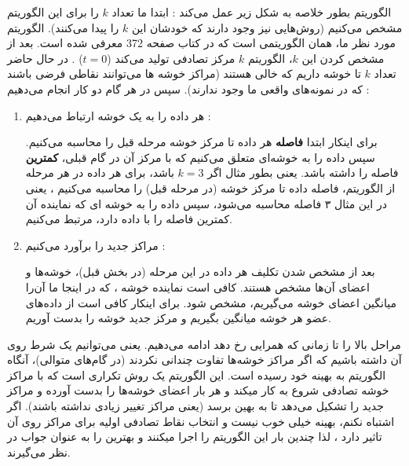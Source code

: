 \documentclass[a4paper, 12pt]{article}
\begin{document}
	الگوریتم 
	بطور خلاصه به شکل زیر عمل می‌کند : ابتدا ما تعداد $k$
	را برای این الگوریتم مشخص می‌کنیم (روش‌هایی نیز وجود دارند که خودشان این $k$ را پیدا می‌کنند). الگوریتم 
	مورد نظر ما، همان الگوریتمی است که در کتاب 
	\cite{book}
	صفحه 
	372
	معرفی شده است. بعد از مشخص کردن این $k$، الگوریتم $k$ مرکز تصادفی تولید می‌کند 
	($t = 0$)
	. در حال حاضر تعداد 
	$k$
	تا
	خوشه داریم که خالی هستند (مراکز خوشه ها می‌توانند نقاطی فرضی باشند که در نمونه‌های واقعی ما وجود ندارند). سپس در هر گام دو کار انجام می‌دهیم  : 
	\begin{enumerate}
		\item 
		هر داده‌ را به یک خوشه ارتباط می‌دهیم :  
		
		برای اینکار ابتدا
		\textbf{فاصله} 
		هر داده تا مرکز خوشه مرحله قبل را محاسبه می‌کنیم. 
		سپس داده را به خوشه‌ای متعلق می‌کنیم که با مرکز آن در گام قبلی، 
		\textbf{کمترین}
		فاصله را داشته باشد. یعنی بطور مثال اگر 
		$k=3$
		باشد، برای هر داده در هر مرحله از الگوریتم، فاصله داده تا مرکز خوشه (در مرحله قبل) را محاسبه می‌کنیم ، یعنی در این مثال ۳ فاصله محاسبه می‌شود، سپس داده را به خوشه ای که نماینده آن کمترین فاصله را با داده دارد، مرتبط می‌کنیم.
		\item
		مراکز جدید را برآورد می‌کنیم :
		
		بعد از مشخص شدن تکلیف هر داده در این مرحله (در بخش قبل)، خوشه‌ها و اعضای آن‌ها مشخص هستند. کافی است نماینده خوشه ، که در اینجا ما آن‌را میانگین اعضای خوشه می‌گیریم، مشخص شود. برای اینکار کافی است از داده‌های عضو هر خوشه میانگین بگیریم و مرکز جدید خوشه را بدست آوریم. 		
	\end{enumerate}  
	
	مراحل بالا را تا زمانی که همرایی رخ دهد ادامه می‌دهیم. یعنی می‌توانیم یک شرط روی آن داشته باشیم که اگر مراکز خوشه‌ها تفاوت چندانی نکردند (در گام‌های متوالی)، آنگاه الگوریتم به بهینه خود رسیده است. این الگوریتم یک روش تکراری است که با مراکز خوشه تصادفی شروع به کار میکند و هر بار اعضای خوشه‌ها را بدست آورده و مراکز جدید را تشکیل می‌دهد تا به بهین برسد (یعنی مراکز تغییر زیادی نداشته باشند). اگر اشتباه نکنم، بهینه 
	خیلی خوب نیست و انتخاب نقاط تصادفی اولیه برای مراکز روی آن تاثیر دارد ، لذا چندین بار این الگوریتم را اجرا میکنند و بهترین را به عنوان جواب در نظر می‌گیرند.
	
\end{document}
